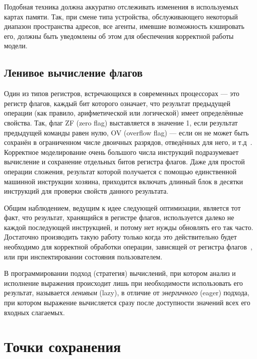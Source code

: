 Подобная техника должна аккуратно отслеживать изменения в используемых картах памяти. Так, при смене типа устройства, обслуживающего некоторый диапазон пространства адресов, все агенты, имевшие возможность кэшировать его, должны быть уведомлены об этом для обеспечения корректной работы модели.

\subsection{Ленивое вычисление флагов}

Один из типов регистров, встречающихся в современных процессорах — это регистр флагов, каждый бит которого означает, что результат предыдущей операции (как правило, арифметической или логической) имеет определённые свойства. Так, флаг ZF (\abbr zero flag) выставляется в значение 1, если результат предыдущей команды равен нулю, OV (\abbr overflow flag) — если он не может быть сохранён в ограниченном числе двоичных разрядов, отведённых для него, и т.д~\citep{intelmanual1}. Корректное моделирование очень большого числа инструкций подразумевает вычисление и сохранение отдельных битов регистра флагов. Даже для простой операции сложения, результат которой получается с помощью единственной машинной инструкции хозяина, приходится включать длинный блок в десятки инструкций для проверки свойств данного результата.

Общим наблюдением, ведущим к идее следующей оптимизации, является тот факт, что результат, хранящийся в регистре флагов, используется далеко не каждой последующей инструкцией, и потому нет нужды обновлять его так часто. Достаточно производить такую работу только когда это действительно будет необходимо для корректной обработки операции, зависящей от регистра флагов~\citep{bochs}, или при инспектировании состояния пользователем. 

\begin{digression}
В программировании подход (стратегия) вычислений, при котором анализ и исполнение выражения происходит лишь при необходимости использовать его результат, называется \textit{ленивым} (\abbr lazy), в отличие от \textit{энергичного} (\abbr eager) подхода, при котором выражение вычисляется сразу после доступности значений всех его входных слагаемых. %
\end{digression}

\section{Точки сохранения}

